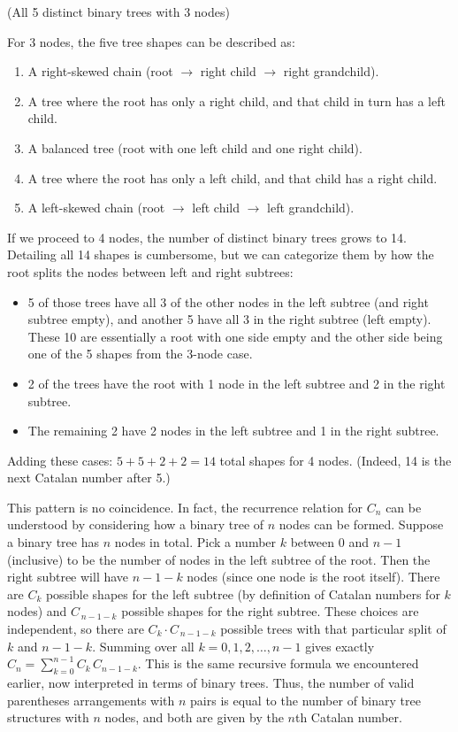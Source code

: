 \documentclass[docmute]{article}
\begin{document}
\vspace{1ex}
\begin{center}
\small (All 5 distinct binary trees with 3 nodes)
\end{center}
\vspace{1ex}

For 3 nodes, the five tree shapes can be described as:
\begin{enumerate}
  \item A right-skewed chain (root $\to$ right child $\to$ right grandchild).
  \item A tree where the root has only a right child, and that child in turn has a left child.
  \item A balanced tree (root with one left child and one right child).
  \item A tree where the root has only a left child, and that child has a right child.
  \item A left-skewed chain (root $\to$ left child $\to$ left grandchild).
\end{enumerate}

If we proceed to 4 nodes, the number of distinct binary trees grows to 14. Detailing all 14 shapes is cumbersome, but we can categorize them by how the root splits the nodes between left and right subtrees:
\begin{itemize}
  \item 5 of those trees have all 3 of the other nodes in the left subtree (and right subtree empty), and another 5 have all 3 in the right subtree (left empty). These 10 are essentially a root with one side empty and the other side being one of the 5 shapes from the 3-node case.
  \item 2 of the trees have the root with 1 node in the left subtree and 2 in the right subtree.
  \item The remaining 2 have 2 nodes in the left subtree and 1 in the right subtree.
\end{itemize}

Adding these cases: $5 + 5 + 2 + 2 = 14$ total shapes for 4 nodes. (Indeed, 14 is the next Catalan number after 5.)

This pattern is no coincidence. In fact, the recurrence relation for $C_n$ can be understood by considering how a binary tree of $n$ nodes can be formed. Suppose a binary tree has $n$ nodes in total. Pick a number $k$ between $0$ and $n-1$ (inclusive) to be the number of nodes in the left subtree of the root. Then the right subtree will have $n-1-k$ nodes (since one node is the root itself). There are $C_k$ possible shapes for the left subtree (by definition of Catalan numbers for $k$ nodes) and $C_{\,n-1-k}$ possible shapes for the right subtree. These choices are independent, so there are $C_k \cdot C_{\,n-1-k}$ possible trees with that particular split of $k$ and $n-1-k$. Summing over all $k=0,1,2,\dots,n-1$ gives exactly $C_n = \sum_{k=0}^{n-1} C_k\,C_{n-1-k}$. This is the same recursive formula we encountered earlier, now interpreted in terms of binary trees. Thus, the number of valid parentheses arrangements with $n$ pairs is equal to the number of binary tree structures with $n$ nodes, and both are given by the $n$th Catalan number.
\end{document}
